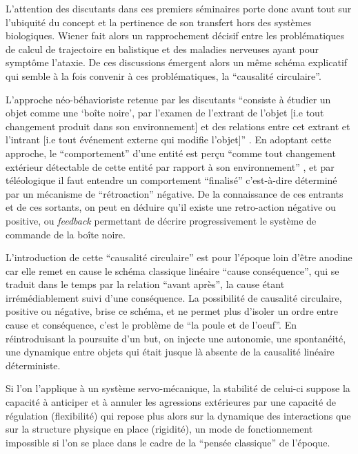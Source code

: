 L'attention des discutants dans ces premiers séminaires porte donc avant tout sur l'ubiquité du concept et la pertinence de son transfert hors des systèmes biologiques. Wiener fait alors un rapprochement décisif entre les problématiques de calcul de trajectoire en balistique et des maladies nerveuses ayant pour symptôme l'ataxie. De ces discussions émergent alors un même schéma explicatif qui semble à la fois convenir à ces problématiques, la \enquote{causalité circulaire}. \autocite[774]{Pouvreau2013, Rosnay1975}

L'approche néo-béhavioriste retenue par les discutants \enquote{consiste à étudier un objet comme une \enquote{boîte noire}, par l'examen de l'extrant de l'objet [i.e tout changement produit dans son environnement] et des relations entre cet extrant et l'intrant [i.e tout événement externe qui modifie l'objet]} \autocite{Pouvreau2013}. En adoptant cette approche, le \enquote{comportement} d'une entité est perçu \enquote{comme tout changement extérieur détectable de cette entité par rapport à son environnement} , et par téléologique il faut entendre un comportement \enquote{finalisé} c'est-à-dire déterminé par un mécanisme de \enquote{rétroaction} négative. De la connaissance de ces entrants et de ces sortants, on peut en déduire qu'il existe une retro-action négative ou positive, ou \textit{feedback} permettant de décrire progressivement le système de commande de la boîte noire.

L'introduction de cette \enquote{causalité circulaire} est pour l'époque loin d'être anodine car elle remet en cause le schéma classique linéaire \enquote {cause \textrightarrow conséquence}, qui se traduit dans le temps par la relation \enquote {avant \textrightarrow après}, la cause étant irrémédiablement suivi d'une conséquence. La possibilité de causalité circulaire, positive ou négative, brise ce schéma, et ne permet plus d'isoler un ordre entre cause et conséquence, c'est le problème de \enquote{la poule et de l'oeuf}. En réintroduisant la poursuite d'un but, on injecte une autonomie, une spontanéité, une dynamique entre objets qui était jusque là absente de la causalité linéaire déterministe.

Si l'on l'applique à un système servo-mécanique, la stabilité de celui-ci suppose la capacité à anticiper et à annuler les agressions extérieures par une capacité de régulation (flexibilité) qui repose plus alors sur la dynamique des interactions que sur la structure physique en place (rigidité), un mode de fonctionnement impossible si l'on se place dans le cadre de la \enquote{pensée classique} de l'époque.

